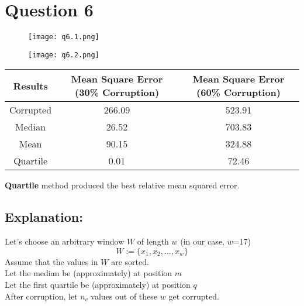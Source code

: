 \documentclass[11pt]{article}
\begin{document}
\section*{Question 6}
\setcounter{equation}{0}
\begin{figure}[H]
    \centering
    \texttt{[image: q6.1.png]}
\end{figure}
\begin{figure}[H]
    \centering
    \texttt{[image: q6.2.png]}
\end{figure}
\begin{center}
    \begin{tabular}{|c|c|c|}
        \hline
        \textbf{Results} & \textbf{Mean Square Error (30\% Corruption)} & \textbf{Mean Square Error (60\% Corruption)} \\
        \hline
        Corrupted        & 266.09                                       & 523.91                                       \\
        \hline
        Median           & 26.52                                        & 703.83                                       \\
        \hline
        Mean             & 90.15                                        &  324.88                                       \\
        \hline
        Quartile         & 0.01                                         & 72.46                                      \\
        \hline
    \end{tabular}
\end{center}

\textbf{Quartile} method produced the best relative mean squared error.
\subsection*{Explanation:}
Let's choose an arbitrary window $W$ of length $w$ (in our case, $w$=17)
$$ W := \{ x_1, x_2, \ldots, x_w \} $$
Assume that the values in $W$ are sorted.\\
Let the median be (approximately) at position $m$\\
Let the first quartile be (approximately) at position $q$\\
After corruption, let $n_c$ values out of these $w$ get corrupted.
\end{document}
